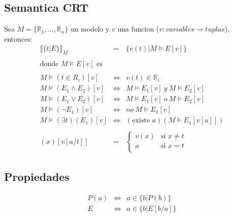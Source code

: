\documentclass[a4paper]{article}
\newcommand{\existe}{\mbox{existe }}
\newcommand{\RE}{\mathbb{R}}
\begin{document}
	\subsection{Semantica CRT}
	Sea $M=\{\RE_1, \ldots, \RE_n\}$ un modelo y $v$ una funcion ($v:variables \rightarrow tuplas$), entonces:
	\begin{eqnarray*}
		\llbracket\{t|E\}\rrbracket _M & = & \{v(t)|M \models E[v] \} \\
		\\
		\mbox{donde }M \models E[v]\mbox{ es}\\
		\\
		M \models (t \in R_i)[v] & \Leftrightarrow & v(t) \in \RE_i \\
		M \models (E_1 \wedge E_2)[v] & \Leftrightarrow & M \models E_1[v] \ y \ M \models E_2[v] \\
		M \models (E_1 \vee E_2)[v] & \Leftrightarrow & M \models E_1[v] \ o \ M \models E_2[v] \\
		M \models (\neg E_1)[v] & \Leftrightarrow & no \ M \models E_1[v] \\
		M \models (\exists t) (E_1)[v] & \Leftrightarrow & (\existe a)(M \models E_1[v[a]] )\\
		\\
		(x)[v[a/t]]  & = & \left\{
			\begin{array}{cc}
						v(x) & \textrm{si } x \neq t \\
						a & \textrm{si } x = t \\
			\end{array}
			\right.
	\end{eqnarray*}
	\subsection{Propiedades}
	\begin{eqnarray*}
	P(a) & \Leftrightarrow & a \in \{b|P(b)\}\\
	E & \Leftrightarrow & a \in \{b|E[b/a]\}\\
	\end{eqnarray*}
\end{document}
